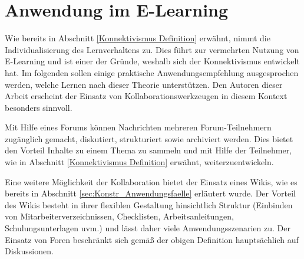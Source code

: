 \section{Anwendung im E-Learning}
Wie bereits in Abschnitt \ref{Konnektivismus Definition} erwähnt, nimmt die Individualisierung des Lernverhaltens zu. Dies führt zur vermehrten Nutzung von E-Learning und ist einer der Gründe, weshalb sich der Konnektivismus entwickelt hat.\cite[S. 47f.]{Kuhlmann.2008} Im folgenden sollen einige praktische Anwendungsempfehlung ausgesprochen werden, welche Lernen nach dieser Theorie unterstützen. Den Autoren dieser Arbeit erscheint der Einsatz von Kollaborationswerkzeugen in diesem Kontext besonders sinnvoll.

Mit Hilfe eines Forums können Nachrichten mehreren Forum-Teilnehmern zugänglich gemacht, diskutiert, strukturiert sowie archiviert werden. Dies bietet den Vorteil Inhalte zu einem Thema zu sammeln und mit Hilfe der Teilnehmer, wie in Abschnitt \ref{Konnektivismus Definition} erwähnt, weiterzuentwickeln.\cite[S. 67f.]{Drummer.2011}

Eine weitere Möglichkeit der Kollaboration bietet der Einsatz eines Wikis, wie es bereits in Abschnitt \ref{sec:Konstr_Anwendungsfaelle} erläutert wurde. Der Vorteil des Wikis besteht in ihrer flexiblen Gestaltung hinsichtlich Struktur (Einbinden von Mitarbeiterverzeichnissen, Checklisten, Arbeitsanleitungen, Schulungsunterlagen uvm.) und lässt daher viele Anwendungsszenarien zu.\cite[S. 77]{Mertins.2009} Der Einsatz von Foren beschränkt sich gemäß der obigen Definition hauptsächlich auf Diskussionen.